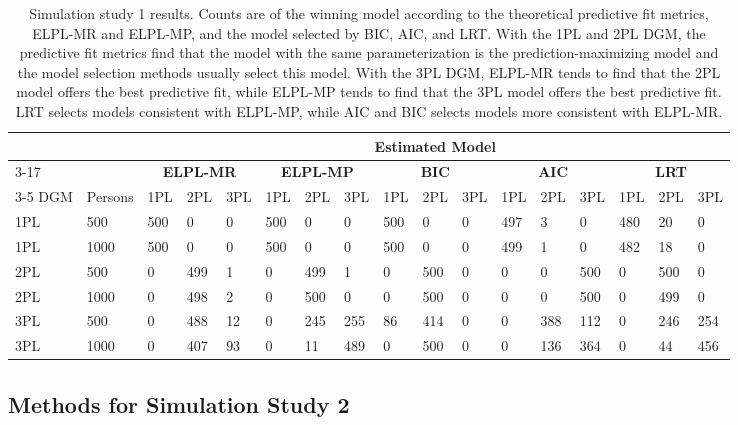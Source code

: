 \documentclass[
  english,
  man,floatsintext]{apa7}
\begin{document}
\setlength{\tabcolsep}{2pt}
\begin{table}
\caption{Simulation study 1 results. Counts are of the winning model according to the theoretical predictive fit metrics, ELPL-MR and ELPL-MP, and the model selected by BIC, AIC, and LRT. With the 1PL and 2PL DGM, the predictive fit metrics find that the model with the same parameterization is the prediction-maximizing model and the model selection methods usually select this model. With the 3PL DGM, ELPL-MR tends to find that the 2PL model offers the best predictive fit, while ELPL-MP tends to find that the 3PL model offers the best predictive fit. LRT selects models consistent with ELPL-MP, while AIC and BIC selects models more consistent with ELPL-MR.}
\centering
\begin{small}
\begin{tabular}{@{\extracolsep{2pt}}lllllllllllllllll}
\hline
&&\multicolumn{15}{c}{\textbf{Estimated Model}} \\ \cmidrule{3-17}
\multirow{2}{*}{} &
    &
    \multicolumn{3}{c}{\textbf{ELPL-MR}} & 
    \multicolumn{3}{c}{\textbf{ELPL-MP}} &
    \multicolumn{3}{c}{\textbf{BIC}} &
    \multicolumn{3}{c}{\textbf{AIC}} &
    \multicolumn{3}{c}{\textbf{LRT}} \\ 
    \cmidrule{3-5} \cmidrule{6-8} \cmidrule{9-11} \cmidrule{12-14} \cmidrule{15-17}
DGM & Persons & 1PL & 2PL & 3PL & 1PL & 2PL & 3PL & 1PL & 2PL & 3PL & 1PL & 2PL & 3PL & 1PL & 2PL & 3PL  \\
\hline
1PL & 500 & 500 & 0 & 0 & 500 & 0 & 0 & 500 & 0 & 0 & 497 & 3 & 0 & 480 & 20 & 0   \\
1PL & 1000 & 500 & 0 & 0 & 500 & 0 & 0 & 500 & 0 & 0 & 499 & 1 & 0 & 482 & 18 & 0 \\
2PL & 500 & 0 & 499 & 1 & 0 & 499 & 1 & 0 & 500 & 0 & 0 & 0 & 500 & 0 & 500 & 0\\
2PL & 1000 & 0 & 498 & 2 & 0 & 500 & 0 & 0 & 500 & 0 & 0 & 0 & 500 & 0 & 499 & 0 \\
3PL & 500 & 0 & 488 & 12 & 0 & 245 & 255 & 86 & 414 & 0 & 0 & 388 & 112 & 0 & 246 & 254\\
3PL & 1000 & 0 & 407 & 93 & 0 & 11 & 489 & 0 & 500 & 0 & 0 & 136 & 364 & 0 & 44 & 456\\
\hline
\end{tabular}
\end{small}
\label{tab:results1}
\end{table}

\hypertarget{methods-for-simulation-study-2}{%
\subsection{Methods for Simulation Study 2}\label{methods-for-simulation-study-2}}
\end{document}
